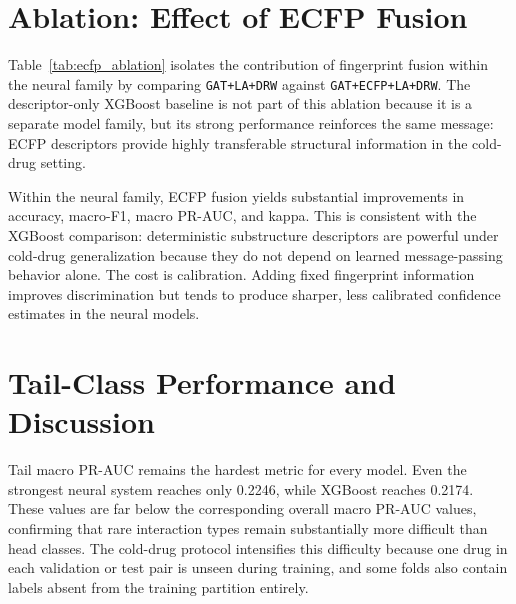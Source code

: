 \section{Ablation: Effect of ECFP Fusion}
Table~\ref{tab:ecfp_ablation} isolates the contribution of fingerprint fusion within the neural family by comparing \texttt{GAT+LA+DRW} against \texttt{GAT+ECFP+LA+DRW}. The descriptor-only XGBoost baseline is not part of this ablation because it is a separate model family, but its strong performance reinforces the same message: ECFP descriptors provide highly transferable structural information in the cold-drug setting.

\begin{table}[H]
\centering
\caption{Ablation: ECFP fusion under identical neural training settings. Mean across five folds.}
\label{tab:ecfp_ablation}
\end{table}

Within the neural family, ECFP fusion yields substantial improvements in accuracy, macro-F1, macro PR-AUC, and kappa. This is consistent with the XGBoost comparison: deterministic substructure descriptors are powerful under cold-drug generalization because they do not depend on learned message-passing behavior alone. The cost is calibration. Adding fixed fingerprint information improves discrimination but tends to produce sharper, less calibrated confidence estimates in the neural models.

\section{Tail-Class Performance and Discussion}
Tail macro PR-AUC remains the hardest metric for every model. Even the strongest neural system reaches only 0.2246, while XGBoost reaches 0.2174. These values are far below the corresponding overall macro PR-AUC values, confirming that rare interaction types remain substantially more difficult than head classes. The cold-drug protocol intensifies this difficulty because one drug in each validation or test pair is unseen during training, and some folds also contain labels absent from the training partition entirely.


